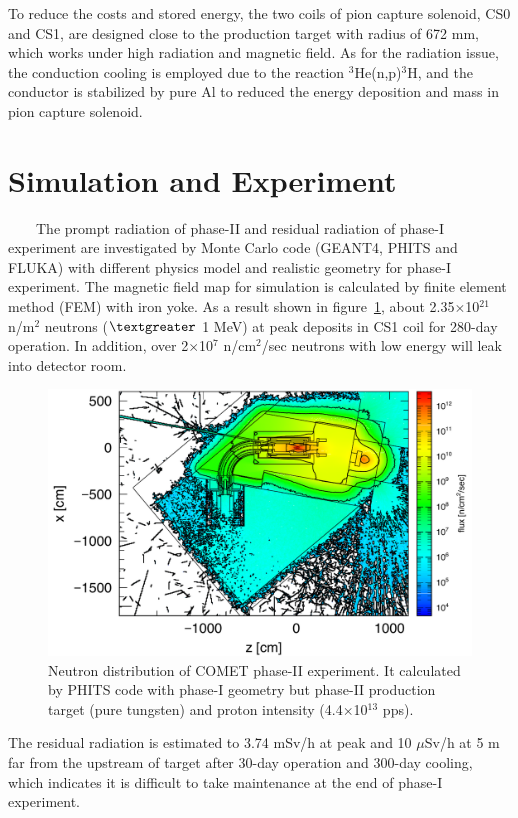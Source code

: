 \documentclass[a4paper, 10pt, twocolumn]{article}
\begin{document}
To reduce the costs and stored energy, the two coils of pion capture solenoid, CS0 and CS1, are designed close to the production target with radius of 672 mm, which works under high radiation and magnetic field.
As for the radiation issue, the conduction cooling is employed due to the reaction $^3$He(n,p)$^3$H, and the conductor is stabilized by pure Al to reduced the energy deposition and mass in pion capture solenoid.

\section{Simulation and Experiment}
~~~~The prompt radiation of phase-II and residual radiation of phase-I experiment are investigated by Monte Carlo code (GEANT4\cite{geant}, PHITS\cite{phits} and FLUKA\cite{fluka}) with different physics model and realistic geometry for phase-I experiment.
The magnetic field map for simulation is calculated by finite element method (FEM) with iron yoke.
As a result shown in figure~\ref{geo}, about 2.35$\times$10$^{21}$ n/m$^2$ neutrons ($\textgreater$ 1 MeV) at peak deposits in CS1 coil for 280-day operation.
In addition, over 2$\times$10$^7$ n/cm$^2$/sec neutrons with low energy will leak into detector room.
\begin{figure}[H]
 \centering
 \includegraphics[scale=0.3]{fig/neutron.pdf}
 \caption{Neutron distribution of COMET phase-II experiment. It calculated by PHITS code with phase-I geometry but phase-II production target (pure tungsten) and proton intensity (4.4$\times$10$^{13}$ pps).}
 \label{geo}
\end{figure}
The residual radiation is estimated to 3.74 mSv/h at peak and 10 $\mu$Sv/h at 5 m far from the upstream of target after 30-day operation and 300-day cooling, which indicates it is difficult to take maintenance at the end of phase-I experiment.
\end{document}
